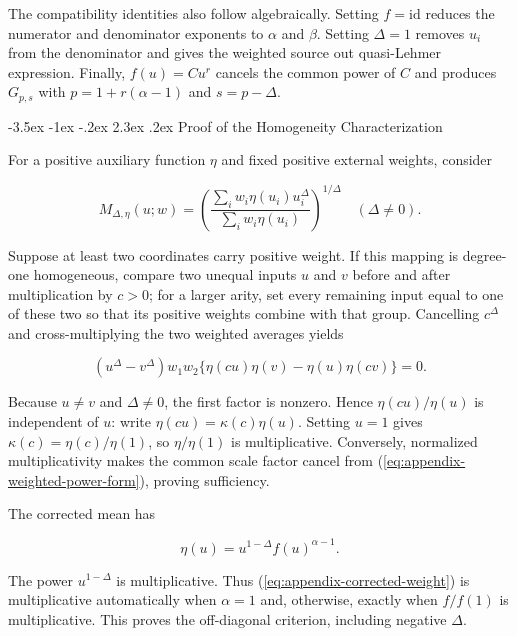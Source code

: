 \documentclass[12pt,a4paper,oneside]{report}
\makeatletter
\renewcommand\section{\@startsection{section}{1}{\z@}%
  {-3.5ex \@plus -1ex \@minus -.2ex}%
  {2.3ex \@plus .2ex}%
  {\normalfont\fontsize{14}{17}\selectfont\bfseries}}
\makeatother
\begin{document}
The compatibility identities also follow algebraically. Setting
$f=\mathrm{id}$ reduces the numerator and denominator exponents to
$\alpha$ and $\beta$. Setting $\Delta=1$ removes $u_i$ from the denominator
and gives the weighted source out quasi-Lehmer expression. Finally,
$f(u)=Cu^r$ cancels the common power of $C$ and produces $G_{p,s}$ with
$p=1+r(\alpha-1)$ and $s=p-\Delta$.

\section{Proof of the Homogeneity Characterization}
\label{sec:proof-corrected-homogeneity}

For a positive auxiliary function $\eta$ and fixed positive external weights,
consider

\begin{equation}
  M_{\Delta,\eta}(u;w)
  =\left(\frac{\sum_i w_i \eta(u_i)u_i^\Delta}
                 {\sum_i w_i \eta(u_i)}\right)^{1/\Delta}
  \quad(\Delta\neq0).
  \label{eq:appendix-weighted-power-form}
\end{equation}

Suppose at least two coordinates carry positive weight. If this mapping is
degree-one homogeneous, compare two unequal inputs $u$ and $v$ before and
after multiplication by $c>0$; for a larger arity, set every remaining input
equal to one of these two so that its positive weights combine with that
group. Cancelling $c^\Delta$ and cross-multiplying the two weighted averages
yields

\begin{equation}
  (u^\Delta-v^\Delta)w_1w_2
  \{\eta(cu)\eta(v)-\eta(u)\eta(cv)\}=0.
  \label{eq:appendix-homogeneity-ratio}
\end{equation}

Because $u\neq v$ and $\Delta\neq0$, the first factor is nonzero. Hence
$\eta(cu)/\eta(u)$ is independent of $u$: write
$\eta(cu)=\kappa(c)\eta(u)$. Setting $u=1$ gives
$\kappa(c)=\eta(c)/\eta(1)$, so $\eta/\eta(1)$ is multiplicative.
Conversely, normalized multiplicativity makes the common scale factor cancel from
(\ref{eq:appendix-weighted-power-form}), proving sufficiency.

The corrected mean has

\begin{equation}
  \eta(u)=u^{1-\Delta}f(u)^{\alpha-1}.
  \label{eq:appendix-corrected-weight}
\end{equation}

The power $u^{1-\Delta}$ is multiplicative. Thus
(\ref{eq:appendix-corrected-weight}) is multiplicative automatically when
$\alpha=1$ and, otherwise, exactly when $f/f(1)$ is multiplicative. This
proves the off-diagonal criterion, including negative $\Delta$.
\end{document}
